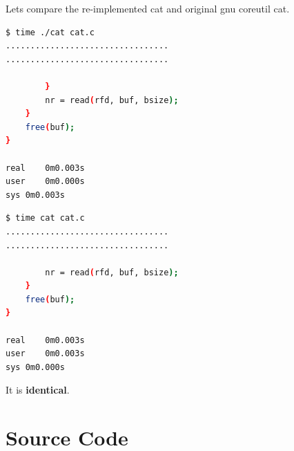 \documentclass[12pt,a4paper,oneside]{report}
\begin{document}
\newpage
Lets compare the re-implemented cat and original gnu coreutil cat.\\
\begin{lstlisting}[language=bash]
$ time ./cat cat.c
.................................
.................................

        }
        nr = read(rfd, buf, bsize);
    }
    free(buf);
}

real	0m0.003s
user	0m0.000s
sys	0m0.003s

\end{lstlisting}
\begin{lstlisting}[language=bash]
$ time cat cat.c
.................................
.................................

        nr = read(rfd, buf, bsize);
    }
    free(buf);
}

real	0m0.003s
user	0m0.003s
sys	0m0.000s

\end{lstlisting}

It is \textbf{identical}.

\chapter*{Source Code}
\inputminted{c}{../src/cat.c}
\newpage
{}
{}

\end{document}
